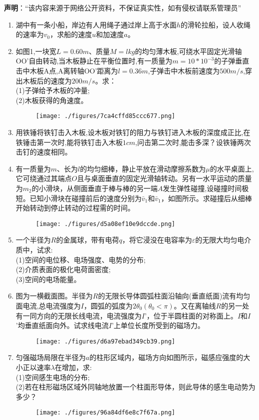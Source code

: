 
\textbf{声明}：“该内容来源于网络公开资料，不保证真实性，如有侵权请联系管理员”


\begin{enumerate}
\item 湖中有一条小船，岸边有人用绳子通过岸上高于水面$h$的滑轮拉船，设人收绳的速率为$v_0$，求船的速度$u$和加速度$a$。
\item 如图1,一块宽$L=0.60m$、质量$M=lkg$的均匀薄木板,可绕水平固定光滑轴OO'自由转动,当木板静止在平衡位置时,有一质量为$m=10*10^{-3}$的子弹垂直击中木板A点,A离转轴OO'距离为$l=0.36m$,子弹击中木板前速度为$500m/s$,穿出木板后的速度为$200m/s$。求：\\
(1)子弹给予木板的冲量;\\
(2)木板获得的角速度。
\begin{figure}[ht]
\centering
\texttt{[image: ./figures/7ca4cffd85ccc677.png]}
\caption{} \label{fig_SSD14_1}
\end{figure}
\item 用铁锤将铁钉击入木板,设木板对铁钉的阻力与铁钉进入木板的深度成正比,在铁锤击第一次时,能将铁钉击入木板$1cm$,问击第二次时,能击多深？设铁锤两次击钉的速度相同。
\item 有一质量为$m$、长为$l$的均匀细棒，静止平放在滑动摩擦系数为$\mu$的水平桌面上,它可绕通过其端点$O$且与桌面垂直的固定光滑轴转动。另有一水平运动的质量为$m_2$的小滑块，从侧面垂直于棒与棒的另一端$A$发生弹性碰撞,设碰撞时间极短。已知小滑块在碰撞前后的速度分别为$\bar v_1$和$\bar v_1$，如图所示。求碰撞后从细棒开始转动到停止转动的过程需的时间。
\begin{figure}[ht]
\centering
\texttt{[image: ./figures/d5a08ef10e9dccde.png]}
\caption{} \label{fig_SSD14_2}
\end{figure}
\item 一个半径为$R$的金属球，带有电荷$q$，将它浸没在电容率为$\varepsilon$的无限大均匀电介质中，试求:\\
(1)空间的电位移、电场强度、电势的分布;\\
(2)介质表面的极化电荷面密度;\\
(3)空间的电场能量。
\item 图为一横截面图。半径为$R$的无限长导体圆弧柱面沿轴向(垂直纸面)流有均匀面电流,总电流强度为$I$，圆弧的弧度为$2\theta_0(\theta_0<\pi)$。又在离轴线$R$的另一处有一同方向的无限长线电流，电流强度为$I$’，位于半圆柱面的对称面上。$I$和$I$’均垂直纸面向外。试求线电流$I$’上单位长度所受到的磁场力。
\begin{figure}[ht]
\centering
\texttt{[image: ./figures/d6a97ebad349cb39.png]}
\caption{} \label{fig_SSD14_4}
\end{figure}
\item 匀强磁场局限在半径为$a$的柱形区域内，磁场方向如图所示，磁感应强度的大小正以速率$\lambda$在增加，求:\\
(1)空间感生电场的分布;\\
(2)若在柱形磁场区域外同轴地放置一个柱面形导体，则此导体的感生电动势为多少？
\begin{figure}[ht]
\centering
\texttt{[image: ./figures/96a84df6e8c7f67a.png]}
\caption{} \label{fig_SSD14_5}
\end{figure}
\end{enumerate}